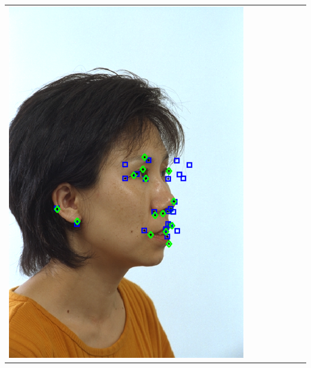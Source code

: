\documentclass[portrait,final,a0paper,fontscale=0.277]{baposter}
\begin{document}
\begin{poster}
{{\begin{tabular}{@{}rccccccc@{}}
\parbox[c]{0.11\linewidth}{\includegraphics[width=\linewidth]{images/l_hr_success_1.pdf}} &

\end{tabular}}}
\end{poster}
\end{document}
